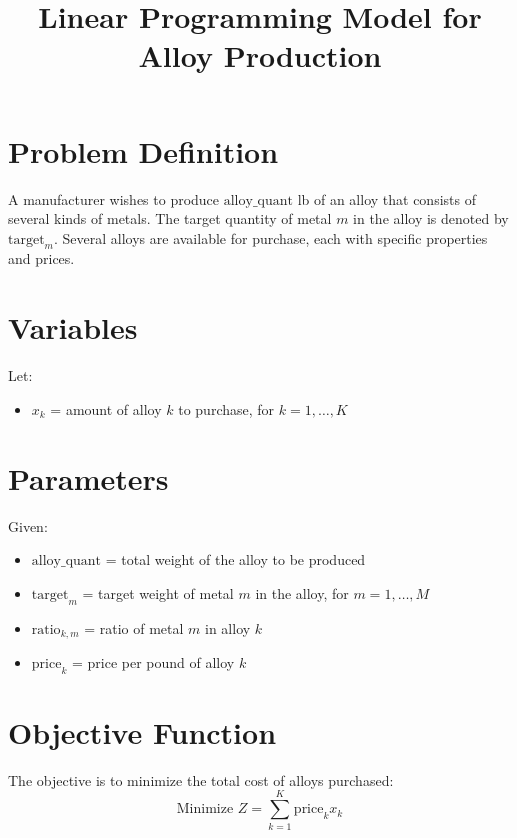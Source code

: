 \documentclass{article}
\begin{document}
\title{Linear Programming Model for Alloy Production}
\author{}
\date{}
\maketitle

\section*{Problem Definition}

A manufacturer wishes to produce \( \text{alloy\_quant} \) lb of an alloy that consists of several kinds of metals. The target quantity of metal \( m \) in the alloy is denoted by \( \text{target}_{m} \). Several alloys are available for purchase, each with specific properties and prices.

\section*{Variables}

Let:
\begin{itemize}
    \item \( x_k \) = amount of alloy \( k \) to purchase, for \( k = 1, \ldots, K \)
\end{itemize}

\section*{Parameters}

Given:
\begin{itemize}
    \item \( \text{alloy\_quant} \) = total weight of the alloy to be produced
    \item \( \text{target}_{m} \) = target weight of metal \( m \) in the alloy, for \( m = 1, \ldots, M \)
    \item \( \text{ratio}_{k, m} \) = ratio of metal \( m \) in alloy \( k \)
    \item \( \text{price}_{k} \) = price per pound of alloy \( k \)
\end{itemize}

\section*{Objective Function}

The objective is to minimize the total cost of alloys purchased:
\[
\text{Minimize } Z = \sum_{k=1}^{K} \text{price}_{k} x_k
\]
\end{document}
